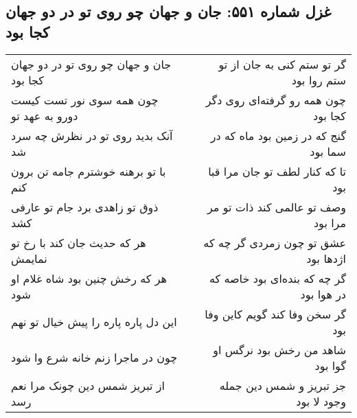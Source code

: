 \begin{center}
\section*{غزل شماره ۵۵۱: جان و جهان چو روی تو در دو جهان کجا بود}
\label{sec:0551}
\begin{longtable}{l p{0.5cm} r}
جان و جهان چو روی تو در دو جهان کجا بود
&&
گر تو ستم کنی به جان از تو ستم روا بود
\\
چون همه سوی نور تست کیست دورو به عهد تو
&&
چون همه رو گرفته‌ای روی دگر کجا بود
\\
آنک بدید روی تو در نظرش چه سرد شد
&&
گنج که در زمین بود ماه که در سما بود
\\
با تو برهنه خوشترم جامه تن برون کنم
&&
تا که کنار لطف تو جان مرا قبا بود
\\
ذوق تو زاهدی برد جام تو عارفی کشد
&&
وصف تو عالمی کند ذات تو مر مرا بود
\\
هر که حدیث جان کند با رخ تو نمایمش
&&
عشق تو چون زمردی گر چه که اژدها بود
\\
هر که رخش چنین بود شاه غلام او شود
&&
گر چه که بنده‌ای بود خاصه که در هوا بود
\\
این دل پاره پاره را پیش خیال تو نهم
&&
گر سخن وفا کند گویم کاین وفا بود
\\
چون در ماجرا زنم خانه شرع وا شود
&&
شاهد من رخش بود نرگس او گوا بود
\\
از تبریز شمس دین چونک مرا نعم رسد
&&
جز تبریز و شمس دین جمله وجود لا بود
\\
\end{longtable}
\end{center}
